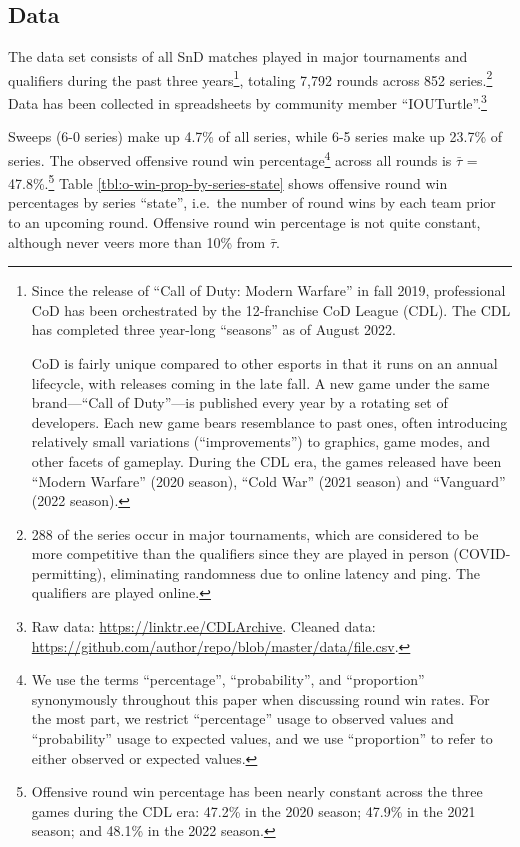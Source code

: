 \documentclass{article}
\begin{document}
\hypertarget{data}{%
\subsection{Data}\label{data}}

The data set consists of all SnD matches played in major tournaments and
qualifiers during the past three years\footnote{Since the release of
  ``Call of Duty: Modern Warfare'' in fall 2019, professional CoD has
  been orchestrated by the 12-franchise CoD League (CDL). The CDL has
  completed three year-long ``seasons'' as of August 2022.

  CoD is fairly unique compared to other esports in that it runs on an
  annual lifecycle, with releases coming in the late fall. A new game
  under the same brand---``Call of Duty''---is published every year by a
  rotating set of developers. Each new game bears resemblance to past
  ones, often introducing relatively small variations (``improvements'')
  to graphics, game modes, and other facets of gameplay. During the CDL
  era, the games released have been ``Modern Warfare'' (2020 season),
  ``Cold War'' (2021 season) and ``Vanguard'' (2022 season).}, totaling
7,792 rounds across 852 series.\footnote{288 of the series occur in
  major tournaments, which are considered to be more competitive than
  the qualifiers since they are played in person (COVID-permitting),
  eliminating randomness due to online latency and ping. The qualifiers
  are played online.} Data has been collected in spreadsheets by
community member ``IOUTurtle''.\footnote{Raw data:
  \url{https://linktr.ee/CDLArchive}. Cleaned data:
  \url{https://github.com/author/repo/blob/master/data/file.csv}.}

Sweeps (6-0 series) make up 4.7\% of all series, while 6-5 series make
up 23.7\% of series. The observed offensive round win
percentage\footnote{We use the terms ``percentage'', ``probability'',
  and ``proportion'' synonymously throughout this paper when discussing
  round win rates. For the most part, we restrict ``percentage'' usage
  to observed values and ``probability'' usage to expected values, and
  we use ``proportion'' to refer to either observed or expected values.}
across all rounds is \(\bar{\tau}\) = 47.8\%.\footnote{Offensive round
  win percentage has been nearly constant across the three games during
  the CDL era: 47.2\% in the 2020 season; 47.9\% in the 2021 season; and
  48.1\% in the 2022 season.} Table \ref{tbl:o-win-prop-by-series-state}
shows offensive round win percentages by series ``state'', i.e.~the
number of round wins by each team prior to an upcoming round. Offensive
round win percentage is not quite constant, although never veers more
than 10\% from \(\bar{\tau}\).
\end{document}
